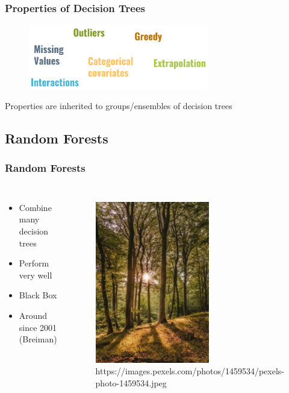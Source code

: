 \documentclass[
    utf8,
    aspectratio=169
]{beamer}  %
\begin{document}
\begin{frame}
	\frametitle{Properties of Decision Trees}
	\begin{figure}
		\includegraphics[width=0.7\textwidth]{pics/tree_words.png}
	\end{figure}
	
	\vfill
	
	\centering Properties are inherited to groups/ensembles of decision trees
\end{frame}

\subsection{Random Forests}

\begin{frame}
	\frametitle{Random Forests}
	\begin{columns}[onlytextwidth]
		\begin{itemize}
			\item Combine many decision trees
			\item Perform very well
			\item Black Box
			\item Around since 2001 (Breiman)
		\end{itemize}
		
		\begin{figure}
			\includegraphics[width=0.6\textwidth]{pics/real_forest.jpg}
			\tiny{https://images.pexels.com/photos/1459534/pexels-photo-1459534.jpeg}
		\end{figure}
	\end{columns}
\end{frame}
\end{document}

